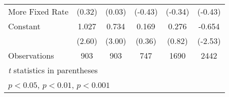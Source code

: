{\begin{tabular}{l*{5}{c}}
More Fixed Rate     &      (0.32)         &      (0.03)         &     (-0.43)         &     (-0.34)         &     (-0.43)         \\
[1em]
Constant            &       1.027\sym{*}  &       0.734\sym{**} &       0.169         &       0.276         &      -0.654\sym{*}  \\
                    &      (2.60)         &      (3.00)         &      (0.36)         &      (0.82)         &     (-2.53)         \\
\hline
Observations        &         903         &         903         &         747         &        1690         &        2442         \\
\hline\hline
\multicolumn{6}{l}{\footnotesize \textit{t} statistics in parentheses}\\
\multicolumn{6}{l}{\footnotesize \sym{*} \(p<0.05\), \sym{**} \(p<0.01\), \sym{***} \(p<0.001\)}\\
\end{tabular}
}
